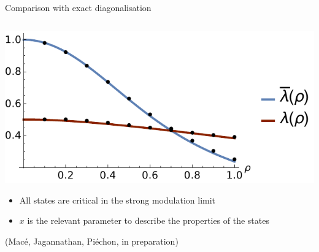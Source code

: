 \documentclass[xcolor=x11names,compress,professionalfonts]{beamer}
\renewcommand{\(}{\begin{columns}}
\renewcommand{\)}{\end{columns}}
\newcommand{\<}[1]{\begin{column}{#1}}
\renewcommand{\>}{\end{column}}
\begin{document}
\begin{frame}{Comparison with exact diagonalisation}
\begin{columns}
\begin{column}{6cm}
		\includegraphics[scale=.5]{renorm_th_num.pdf}
		
		\begin{itemize}
			\item All states are critical in the strong modulation limit
			\item $x$ is the relevant parameter to describe the properties of the states
		\end{itemize}
		
		\begin{flushright}
		\scriptsize{(Macé, Jagannathan, Piéchon, in preparation)}
		\end{flushright}
	\end{column}
\end{columns}
\end{frame}
\end{document}
